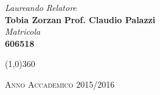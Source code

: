 \documentclass[a4paper, 12pt, twoside, openright]{book}
\begin{document}
\begin{titlepage}
\vfill
\begin{normalsize}
\begin{flushleft}
  \hspace{45pt} \textit{Laureando} \hspace{160pt} \textit{Relatore}\\
  \vspace{5pt}
  \hspace{30pt} \large{\textbf{Tobia Zorzan}} \hspace{70pt} \large{\textbf{Prof. Claudio Palazzi}}\\
  \vspace{15pt}
  \hspace{45pt} \textit{Matricola}\\
  \vspace{5pt}
  \hspace{50pt}  \large{\textbf{606518}} \\
\end{flushleft}
\end{normalsize}

\vfill
\begin{center}
\hspace{-0.2cm}
\begin{center}
\line(1,0){360}
\end{center}

\textsc{Anno Accademico 2015/2016}
\end{center}
\end{titlepage}







\begingroup %
  \makeatletter
  \let\ps@plain\ps@empty
  \makeatother
  \tableofcontents
  \clearpage
\endgroup
\end{document}
